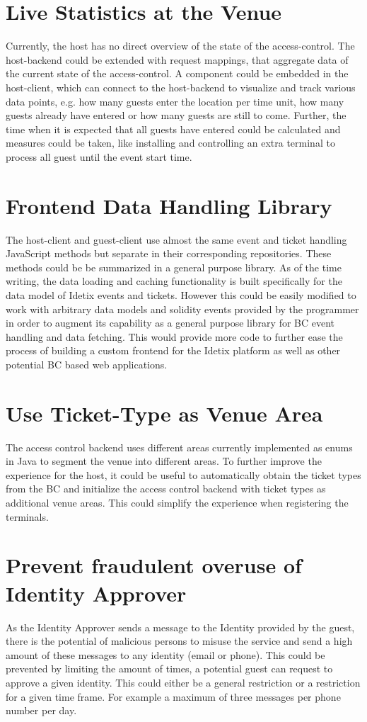 \section{Live Statistics at the Venue}
Currently, the host has no direct overview of the state of the access-control. The host-backend could be extended with request mappings, that aggregate data of the current state of the access-control. A component could be embedded in the host-client, which can connect to the host-backend to visualize and track various data points, e.g. how many guests enter the location per time unit, how many guests already have entered or how many guests are still to come. Further, the time when it is expected that all guests have entered could be calculated and measures could be taken, like installing and controlling an extra terminal to process all guest until the event start time.

\section{Frontend Data Handling Library}
The host-client and guest-client use almost the same event and ticket handling JavaScript methods but separate in their corresponding repositories. These methods could be be summarized in a general purpose library. As of the time writing, the data loading and caching functionality is built specifically for the data model of Idetix events and tickets. However this could be easily modified to work with arbitrary data models and solidity events provided by the programmer in order to augment its capability as a general purpose library for BC event handling and data fetching. This would provide more code to further ease the process of building a custom frontend for the Idetix platform as well as other potential BC based web applications. 

\section{Use Ticket-Type as Venue Area}
The access control backend uses different areas currently implemented as enums in Java to segment the venue into different areas. To further improve the experience for the host, it could be useful to automatically obtain the ticket types from the BC and initialize the access control backend with ticket types as additional venue areas. This could simplify the experience when registering the terminals.

\section{Prevent fraudulent overuse of Identity Approver}
As the Identity Approver sends a message to the Identity provided by the guest, there is the potential of malicious persons to misuse the service and send a high amount of these messages to any identity (email or phone). This could be prevented by limiting the amount of times, a potential guest can request to approve a given identity. This could either be a general restriction or a restriction for a given time frame. For example a maximum of three messages per phone number per day.